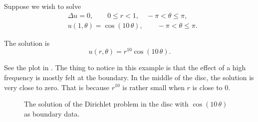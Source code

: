 \documentclass[12pt]{book}
\begin{document}
\begin{example}
Suppose we wish to solve
\begin{align*}
& \Delta u = 0 , \qquad 0 \leq r < 1, \quad -\pi < \theta \leq \pi,\\
& u(1,\theta) = \cos(10\,\theta), \qquad -\pi < \theta \leq \pi.
\end{align*}

The solution is
\begin{equation*}
u(r,\theta) = r^{10} \cos(10\,\theta) .
\end{equation*}

See the plot in .
The thing to notice in this example is that the effect of a high frequency
is mostly felt at the boundary.  In the middle of the disc, the solution
is very close to zero.  That is because $r^{10}$ is rather small when $r$
is close to 0.
\begin{figure}[h!t]
\capstart
\begin{center}
\caption{The solution of the Dirichlet problem in the disc with
$\cos(10\,\theta)$ as boundary data.\label{dirichdisc:tenspeedfig}}
\end{center}
\end{figure}
\end{example}
\end{document}
